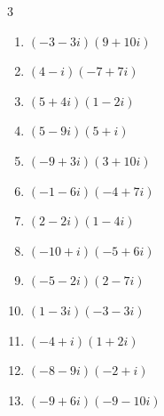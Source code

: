 \begin{multicols}{3}
\begin{enumerate}
        \phantom{$\displaystyle =86+4i$}

  \item $\displaystyle (-3-3i)(9+10i)$

        \phantom{$\displaystyle =3-57i$}

  \item $\displaystyle (4-i)(-7+7i)$

        \phantom{$\displaystyle =-21+35i$}

  \item $\displaystyle (5+4i)(1-2i)$

        \phantom{$\displaystyle =13-6i$}

\columnbreak %

  \item $\displaystyle (5-9i)(5+i)$

        \phantom{$\displaystyle =34-40i$}

  \item $\displaystyle (-9+3i)(3+10i)$

        \phantom{$\displaystyle =-57-81i$}

  \item $\displaystyle (-1-6i)(-4+7i)$

        \phantom{$\displaystyle =46+17i$}

  \item $\displaystyle (2-2i)(1-4i)$

        \phantom{$\displaystyle =-6-10i$}

  \item $\displaystyle (-10+i)(-5+6i)$

        \phantom{$\displaystyle =44-65i$}

  \item $\displaystyle (-5-2i)(2-7i)$

        \phantom{$\displaystyle =-24+31i$}

  \item $\displaystyle (1-3i)(-3-3i)$

        \phantom{$\displaystyle =-12+6i$}

  \item $\displaystyle (-4+i)(1+2i)$

        \phantom{$\displaystyle =-6-7i$}

  \item $\displaystyle (-8-9i)(-2+i)$

        \phantom{$\displaystyle =25+10i$}

  \item $\displaystyle (-9+6i)(-9-10i)$


\end{enumerate}
\end{multicols}
